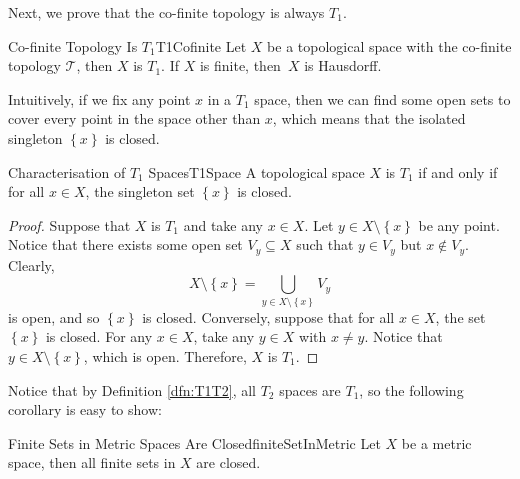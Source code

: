 \documentclass[math]{amznotes}
\theoremstyle{remark}
\begin{document}
Next, we prove that the co-finite topology is always $T_1$.
\begin{probox}{Co-finite Topology Is $T_1$}{T1Cofinite}
    Let $X$ be a topological space with the co-finite topology $\mathcal{T}$, then $X$ is $T_1$. If $X$ is finite, then~$X$ is Hausdorff.
\end{probox}
Intuitively, if we fix any point $x$ in a $T_1$ space, then we can find some open sets to cover every point in the space other than $x$, which means that the isolated singleton $\left\{x\right\}$ is closed.
\begin{probox}{Characterisation of $T_1$ Spaces}{T1Space}
    A topological space $X$ is $T_1$ if and only if for all $x \in X$, the singleton set $\left\{x\right\}$ is closed.
    \tcblower
    \begin{proof}
        Suppose that $X$ is $T_1$ and take any $x \in X$. Let $y \in X \setminus \left\{x\right\}$ be any point. Notice that there exists some open set $V_y \subseteq X$ such that $y \in V_y$ but $x \notin V_y$. Clearly, 
        \begin{equation*}
            X \setminus \left\{x\right\} = \bigcup_{y \in X \setminus \left\{x\right\}}V_y
        \end{equation*}
        is open, and so $\left\{x\right\}$ is closed. Conversely, suppose that for all $x \in X$, the set $\left\{x\right\}$ is closed. For any $x \in X$, take any $y \in X$ with $x \neq y$. Notice that $y \in X \setminus \left\{x\right\}$, which is open. Therefore, $X$ is $T_1$.
    \end{proof}
\end{probox}
Notice that by Definition \ref{dfn:T1T2}, all $T_2$ spaces are $T_1$, so the following corollary is easy to show:
\begin{corbox}{Finite Sets in Metric Spaces Are Closed}{finiteSetInMetric}
    Let $X$ be a metric space, then all finite sets in $X$ are closed.
\end{corbox}
\end{document}
